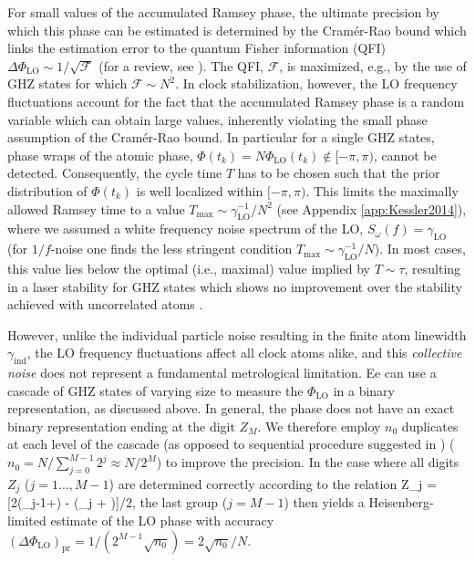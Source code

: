 For small values of the accumulated Ramsey phase, the ultimate precision by
which this phase can be estimated is determined by the Cram\'{e}r-Rao bound
\cite{Rao1945,Giovanetti2011} which 
links the estimation error to the quantum Fisher information (QFI)
$\Delta\Phi_\mathrm{LO} \sim 1/\sqrt{\mathcal F}$ (for a review, see
\cite{Giovanetti2011}). The QFI, $\mathcal F$, is maximized, e.g., by the use of
GHZ states for which $\mathcal F \sim N^2$.
In clock stabilization, however, the LO frequency fluctuations account for the
fact that the accumulated Ramsey phase is a random variable which can obtain
large values, inherently violating the small phase assumption of the
Cram\'{e}r-Rao bound.
In particular for a single GHZ states, phase wraps of the atomic phase,
$\Phi(t_k)=N \Phi_\mathrm{LO}(t_k)\notin[-\pi,\pi)$, cannot be detected.
Consequently, the cycle time $T$ has to be
chosen such that the prior distribution of $\Phi(t_k)$ is well localized
within $[-\pi,\pi)$.
This limits the maximally allowed Ramsey time to a value $T_\mathrm{max}
\sim\gamma_\mathrm{LO}^{-1}/N^2$ (see 
Appendix \ref{app:Kessler2014}), where we assumed a white frequency noise
spectrum of the LO, $S_\omega(f) = \gamma_\mathrm{LO}$ (for $1/f$-noise one finds the less stringent
condition $T_\mathrm{max} \sim\gamma_\mathrm{LO}^{-1}/N$). In most cases, this value
lies below the optimal (i.e., maximal) value implied by
 $T\sim\tau$, resulting in a laser stability for GHZ
states which shows no improvement over the stability achieved with uncorrelated
atoms \cite{Wineland1998, Rosenband2012_numerical}.

However, unlike the individual particle noise resulting in the finite atom
linewidth $\gamma_\mathrm{ind}$, the LO frequency fluctuations affect all clock
atoms alike, and this \textit{collective noise} does not represent a fundamental
metrological limitation.
Ee can use a cascade of GHZ states of varying size to measure the
$\Phi_\mathrm{LO}$ in a binary representation, as discussed above.
In general, the phase does not have an exact binary representation ending at the
digit $Z_{M}$. We therefore employ $n_0$ duplicates  at each level of the
cascade (as opposed to sequential procedure suggested in \cite{Giovannetti2006})
($n_0 =N/\sum_{j=0}^{M-1} 2^j \approx N/2^M$) to improve the precision.
 In the case where all digits $Z_j$ ($j=1\dots, M-1$) are determined correctly
 according to the relation
\bel
Z_j =
[2(\Phi_{j-1}+\pi) - (\Phi_j + \pi)]/2\pi,
\eel
the last group ($j=M-1$) then yields a Heisenberg-limited estimate of
the LO phase with accuracy $(\Delta\Phi_\mathrm{LO})_\mathrm{pr} =
1/(2^{M-1} \sqrt{n_0}) = 2\sqrt{n_0}/N$.

